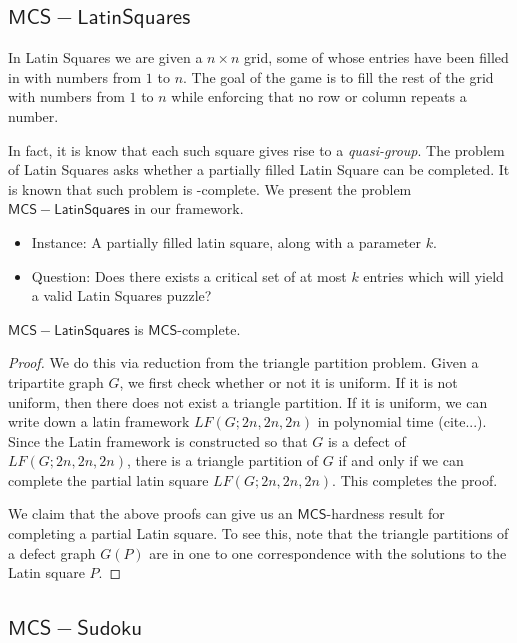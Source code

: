 \documentclass[runningheads,a4paper]{llncs}
\begin{document}
\subsection{$\mathsf{MCS-LatinSquares}$}

In Latin Squares we are given a $n \times n$ grid, some of whose entries have been filled in with numbers from $1$ to $n$. The goal of the game is to fill the rest of the grid with numbers from $1$ to $n$ while enforcing that no row or column repeats a number. 

In fact, it is know that each such square gives rise to a \emph{quasi-group}. The problem of Latin Squares asks whether a partially filled Latin Square can be completed. It is known that such problem is \NP-complete. We present the problem $\mathsf{MCS-Latin Squares}$ in our framework.

\begin{itemize}
\item Instance: A partially filled latin square, along with a parameter $k$. 
\item Question: Does there exists a critical set of at most  $k$ entries which will yield a valid Latin Squares puzzle?
\end{itemize}


\begin{theorem}
$\mathsf{MCS-Latin Squares}$ is $\mathsf{MCS}$-complete.
\end{theorem}

\begin{proof}
We do this via reduction from the triangle partition problem. Given a tripartite graph $G$, we first check whether or not it is uniform. If it is not uniform, then there does not exist a triangle partition. If it is uniform, we can write down a latin framework $LF(G;2n,2n,2n)$ in polynomial time (cite...). Since the Latin framework is constructed so that $G$ is a defect of $LF(G;2n,2n,2n)$, there is a triangle partition of $G$ if and only if we can complete the partial latin square $LF(G;2n,2n,2n)$. This completes the proof.

We claim that the above proofs can give us an $\mathsf{MCS}$-hardness result for completing a partial Latin square. To see this, note that the triangle partitions of a defect graph $G(P)$ are in one to one correspondence with the solutions to the Latin square $P$.
\end{proof}

\subsection{$\mathsf{MCS-Sudoku}$}
\end{document}
